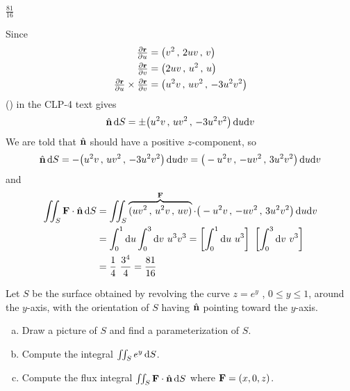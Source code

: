 %

\begin{answer} 
$\frac{81}{16}$
\end{answer}

\begin{solution} Since
\begin{align*}
\tfrac{\partial\mathbf{r}}{\partial u}
&=\big(v^2\,,\,
       2uv\,,\,
        v \big) \\
\tfrac{\partial\mathbf{r}}{\partial v}
&=\big(2uv\,,\,
        u^2\,,\,
        u \big) \\
\tfrac{\partial\mathbf{r}}{\partial u} \times \tfrac{\partial\mathbf{r}}{\partial v} 
&=\big(u^2v\,,\,
       uv^2\,,\,
       -3u^2v^2\big)
\end{align*}
() in the CLP-4 text gives
\begin{equation*}
\hat{\mathbf{n}}\,\mathrm{d}S = \pm  \big(u^2v\,,\,
       uv^2\,,\,
       -3u^2v^2\big)\,\mathrm{d}u\mathrm{d}v
\end{equation*}
We are told that $\hat{\mathbf{n}}$ should have a positive $z$-component, so
\begin{equation*}
\hat{\mathbf{n}}\,\mathrm{d}S = -  \big(u^2v\,,\, uv^2\,,\, -3u^2v^2\big)\,\mathrm{d}u\mathrm{d}v
 = \big(-u^2v\,,\, -uv^2\,,\, 3u^2v^2\big)\,\mathrm{d}u\mathrm{d}v
\end{equation*}
and
\begin{align*}
\iint_S \mathbf{F}\cdot\hat{\mathbf{n}}\,\mathrm{d}S
&=\iint_S \overbrace{(uv^2\,,\,u^2v\,,\,uv)}^{\mathbf{F}}\cdot
         \big(-u^2v\,,\, -uv^2\,,\, 3u^2v^2\big)\,\mathrm{d}u\mathrm{d}v \\
&=\int_0^1\mathrm{d}u\int_0^3\mathrm{d}v\ u^3v^3 
=\left[\int_0^1\mathrm{d}u\ u^3 \right]\  \left[\int_0^3\mathrm{d}v\ v^3\right] \\
&=\frac{1}{4}\ \frac{3^4}{4}
=\frac{81}{16}
\end{align*} 
\end{solution}

\begin{question}[M317 2015A]  %
Let $S$ be the surface obtained by revolving the curve 
$z = e^y$ , $0 \le y \le 1$, around the $y$-axis, with the 
orientation of $S$ having $\hat{\mathbf{n}}$ pointing toward the $y$-axis.
\begin{enumerate}[(a)]
\item
Draw a picture of $S$ and find a parameterization of $S$.

\item
Compute the integral $\iint_S e^y\, \mathrm{d}S$.

\item
Compute the flux integral $\iint_S\mathbf{F}\cdot\hat{\mathbf{n}}\,\mathrm{d}S$
where $\mathbf{F}= (x, 0, z)$.

\end{enumerate}
\end{question}

